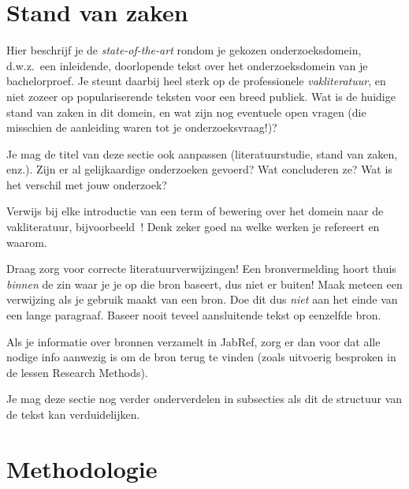 
\section{Stand van zaken}%
\label{sec:stand van zaken}

Hier beschrijf je de \emph{state-of-the-art} rondom je gekozen onderzoeksdomein, d.w.z.\ een inleidende, doorlopende tekst over het onderzoeksdomein van je bachelorproef. Je steunt daarbij heel sterk op de professionele \emph{vakliteratuur}, en niet zozeer op populariserende teksten voor een breed publiek. Wat is de huidige stand van zaken in dit domein, en wat zijn nog eventuele open vragen (die misschien de aanleiding waren tot je onderzoeksvraag!)?

Je mag de titel van deze sectie ook aanpassen (literatuurstudie, stand van zaken, enz.). Zijn er al gelijkaardige onderzoeken gevoerd? Wat concluderen ze? Wat is het verschil met jouw onderzoek?

Verwijs bij elke introductie van een term of bewering over het domein naar de vakliteratuur, bijvoorbeeld~\autocites{KernanFreire2024}! Denk zeker goed na welke werken je refereert en waarom. 

Draag zorg voor correcte literatuurverwijzingen! Een bronvermelding hoort thuis \emph{binnen} de zin waar je je op die bron baseert, dus niet er buiten! Maak meteen een verwijzing als je gebruik maakt van een bron. Doe dit dus \emph{niet} aan het einde van een lange paragraaf. Baseer nooit teveel aansluitende tekst op eenzelfde bron.

Als je informatie over bronnen verzamelt in JabRef, zorg er dan voor dat alle nodige info aanwezig is om de bron terug te vinden (zoals uitvoerig besproken in de lessen Research Methods).


Je mag deze sectie nog verder onderverdelen in subsecties als dit de structuur van de tekst kan verduidelijken.

\section{Methodologie}%
\label{sec:methodologie}


